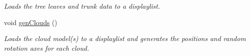\begin{DoxyCompactItemize}
\begin{DoxyCompactList}\small\item\em Loads the tree leaves and trunk data to a displaylist. \item\end{DoxyCompactList}\item 
\hypertarget{classPlanet_a07562d7e4f8cbf2b415d9f015a4460b6}{
void \hyperlink{classPlanet_a07562d7e4f8cbf2b415d9f015a4460b6}{genClouds} ()}
\label{classPlanet_a07562d7e4f8cbf2b415d9f015a4460b6}

\begin{DoxyCompactList}\small\item\em Loads the cloud model(s) to a displaylist and generates the positions and random rotation axes for each cloud. \item\end{DoxyCompactList}\end{DoxyCompactItemize}
